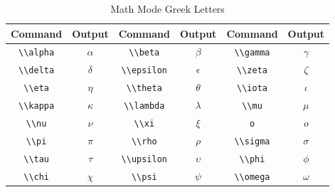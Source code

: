 	
	
	\begin{table}[ht]
		\centering
		\caption{Math Mode Greek Letters}
		\label{tab:greek_letters}
		\begin{tabularx}{\textwidth}{CCCCCC}
		\toprule
				\textbf{Command} & \textbf{Output} & \textbf{Command} & \textbf{Output} & \textbf{Command} & \textbf{Output} \\
			\midrule
				\lstinline|\\alpha| & \(\alpha\) & \lstinline|\\beta| & \(\beta\) & \lstinline|\\gamma| & \(\gamma\) \\
				\lstinline|\\delta| & \(\delta\) & \lstinline|\\epsilon| & \(\epsilon\) & \lstinline|\\zeta| & \(\zeta\) \\
				\lstinline|\\eta| & \(\eta\) & \lstinline|\\theta| & \(\theta\) & \lstinline|\\iota| & \(\iota\) \\
				\lstinline|\\kappa| & \(\kappa\) & \lstinline|\\lambda| & \(\lambda\) & \lstinline|\\mu| & \(\mu\) \\
				\lstinline|\\nu| & \(\nu\) & \lstinline|\\xi| & \(\xi\) & \lstinline|o| & \(o\) \\
				\lstinline|\\pi| & \(\pi\) & \lstinline|\\rho| & \(\rho\) & \lstinline|\\sigma| & \(\sigma\) \\
				\lstinline|\\tau| & \(\tau\) & \lstinline|\\upsilon| & \(\upsilon\) & \lstinline|\\phi| & \(\phi\) \\
				\lstinline|\\chi| & \(\chi\) & \lstinline|\\psi| & \(\psi\) & \lstinline|\\omega| & \(\omega\) \\

\end{tabularx}
\end{table}
